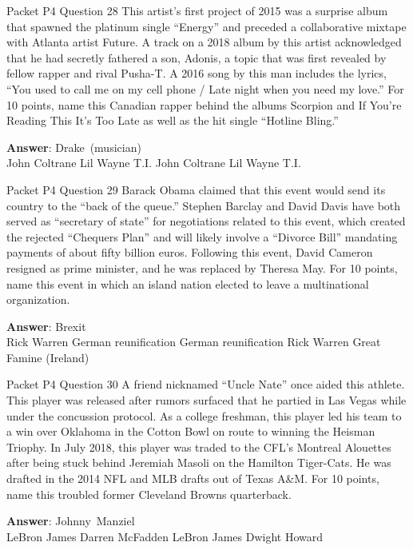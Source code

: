 \begin{frame}{Packet P4 Question 28}
This artist's first project of 2015 was a surprise album that spawned the platinum single ``Energy'' and preceded a collaborative mixtape with Atlanta artist Future. A track on a 2018 album by this artist acknowledged that he had secretly fathered a son, Adonis, a   topic that was first revealed by fellow rapper and rival Pusha-T.   A 2016 song by this man includes the lyrics, ``You used to call me on my cell phone / Late night when you need my   love.'' For 10 points, name this Canadian rapper behind the albums   Scorpion and If You're Reading This It's Too Late as well as the hit single ``Hotline Bling.''      

\textbf{Answer}: Drake\ (musician)\\
 John Coltrane
 Lil Wayne
 T.I.
 John Coltrane
 Lil Wayne
 T.I.
\end{frame}

\begin{frame}{Packet P4 Question 29}
Barack Obama claimed that   this event would send its country to the ``back of the queue.'' Stephen Barclay and David Davis have both served as ``secretary of state'' for negotiations related to this event, which created the rejected ``Chequers Plan''   and will likely involve a ``Divorce Bill'' mandating payments of about fifty billion euros. Following this event, David Cameron resigned as prime minister, and   he was replaced by Theresa May. For 10 points, name this event in which an island nation elected to leave a multinational organization.      

\textbf{Answer}: Brexit\\
 Rick Warren
 German reunification
 German reunification
 Rick Warren
 Great Famine (Ireland)
\end{frame}

\begin{frame}{Packet P4 Question 30}
A friend nicknamed ``Uncle Nate'' once aided this athlete. This player was released after rumors surfaced that he partied in Las Vegas while under the concussion protocol. As a college freshman, this player led his team to a win over Oklahoma in   the Cotton Bowl on route to winning the Heisman Triophy. In July 2018, this player was traded to the CFL's Montreal Alouettes after being stuck behind Jeremiah Masoli on the Hamilton Tiger-Cats. He was drafted in the 2014 NFL and MLB drafts out of Texas A\&M. For 10 points, name this troubled former Cleveland Browns   quarterback.      

\textbf{Answer}: Johnny\ Manziel\\
 LeBron James
 Darren McFadden
 LeBron James
 Dwight Howard
\end{frame}

